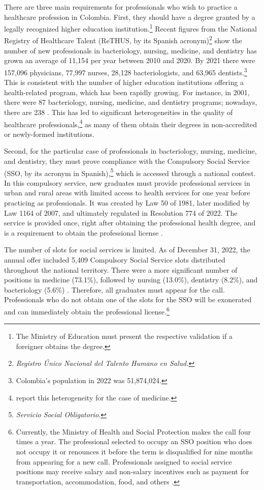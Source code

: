 \documentclass[12pt, a4paper]{article}
\begin{document}
There are three main requirements for professionals who wish to practice a healthcare profession in Colombia. First, they should have a degree granted by a legally recognized higher education institution.\footnote{The Ministry of Education must present the respective validation if a foreigner obtains the degree.} Recent figures from the National Registry of Healthcare Talent (ReTHUS, by its Spanish acronym)\footnote{\textit{Registro Único Nacional del Talento Humano en Salud.}} show the number of new professionals in bacteriology, nursing, medicine, and dentistry has grown an average of 11,154 per year between 2010 and 2020. By 2021 there were 157,096 physicians, 77,997 nurses, 28,128 bacteriologists, and 63,965 dentists.\footnote{Colombia's population in 2022 was 51,874,024.} This is consistent with the number of higher education institutions offering a health-related program, which has been rapidly growing. For instance, in 2001, there were 87 bacteriology, nursing, medicine, and dentistry programs; nowadays, there are 238 \citep{SPADIES}. This has led to significant heterogeneities in the quality of healthcare professionals,\footnote{\citet{Posso2024births} report this heterogeneity for the case of medicine.} as many of them obtain their degrees in non-accredited or newly-formed institutions.

Second, for the particular case of professionals in bacteriology, nursing, medicine, and dentistry, they must prove compliance with the Compulsory Social Service (SSO, by its acronym in Spanish),\footnote{\textit{Servicio Social Obligatorio}.} which is accessed through a national contest. In this compulsory service, new graduates must provide professional services in urban and rural areas with limited access to health services for one year before practicing as professionals. It was created by Law 50 of 1981, later modified by Law 1164 of 2007, and ultimately regulated in Resolution 774 of 2022. The service is provided once, right after obtaining the professional health degree, and is a requirement to obtain the professional license \citep{ley1164}. 

The number of slots for social services is limited. As of December 31, 2022, the annual offer included 5,409 Compulsory Social Service slots distributed throughout the national territory. There were a more significant number of positions in medicine (73.1\%), followed by nursing (13.0\%), dentistry (8.2\%), and bacteriology (5.6\%) \citep{SISPRO}. Therefore, all graduates must appear for the call. Professionals who do not obtain one of the slots for the SSO will be exonerated and can immediately obtain the professional license.\footnote{Currently, the Ministry of Health and Social Protection makes the call four times a year. The professional selected to occupy an SSO position who does not occupy it or renounces it before the term is disqualified for nine months from appearing for a new call. Professionals assigned to social service positions may receive salary and non-salary incentives such as payment for transportation, accommodation, food, and others \citep{Minsaludyprotecciónsocial}.}
\end{document}
